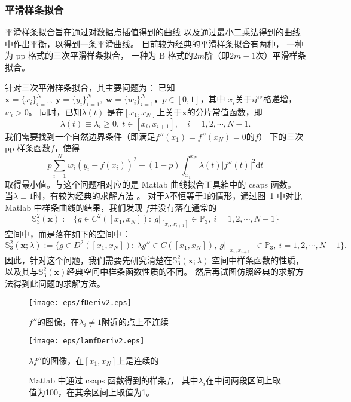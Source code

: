 \subsubsection{平滑样条拟合}
平滑样条拟合旨在通过对数据点插值得到的曲线
以及通过最小二乘法得到的曲线中作出平衡，以得到一条平滑曲线。
目前较为经典的平滑样条拟合有两种，
一种为 pp 格式的三次平滑样条拟合，
一种为 B 格式的$2m$阶（即$2m-1$次）平滑样条拟合。
  
针对三次平滑样条拟合，其主要问题为：
已知$\mathbf{x}=\{x_{i}\}_{i=1}^{N},\ \mathbf{y}=\{y_{i}\}_{i=1}^{N},
\ \mathbf{w}=\{w_{i}\}_{i=1}^{N}$，$p\in [0,1]$，其中
$x_{i}$关于$i$严格递增，$w_{i}>0$。
同时，已知$\lambda(t)$
是在$[x_{1},x_{N}]$上关于$\mathbf{x}$的分片常值函数，即
\begin{equation}
  \label{eq:lambdatx}
  \lambda(t)\equiv \lambda_{i}\ge 0,\
  t\in [x_{i},x_{i+1}],\quad i=1,2,\cdots,N-1.
\end{equation}
我们需要找到一个自然边界条件（即满足$f''(x_{1})=f''(x_{N})=0$的$f$）
下的三次 pp 样条函数$f$，使得
\begin{equation}
  \label{eq:cubicSmoothingSplinesFitting}
  p\sum_{i=1}^{N}w_{i}(y_{i}-f(x_{i}))^{2}+
  (1-p)\int_{x_{1}}^{x_{N}}\lambda(t)|f''(t)|^{2}\mathrm{d}t
\end{equation}
取得最小值。与这个问题相对应的是 Matlab 曲线拟合工具箱中的 csaps 函数。
当$\lambda\equiv1$时，有较为经典的求解方法
\cite{GuideToSplines}。
对于$\lambda$不恒等于1的情形，通过图~\ref{fig:cubicSplinesSpaceCompare}
中对比 Matlab 中样条曲线的结果，我们发现
$f$并没有落在通常的
\begin{equation}
  \label{eq:cubicSplinesSpace}
  \mathbb{S}_{3}^{2}(\mathbf{x}):=\{g\in C^{2}([x_{1},x_{N}]):
  \ g|_{[x_{i},x_{i+1}]}\in \mathbb{P}_{3},\ i=1,2,\cdots,N-1\}
\end{equation}
空间中，而是落在如下的空间中：
\begin{equation}
  \label{eq:cubicSplinesSpaceLambda}
  \mathbb{S}_{3}^{2}(\mathbf{x};\lambda)
  :=\{g\in D^{2}([x_{1},x_{N}]):
  \ \lambda g''\in C([x_{1},x_{N}]),
  \ g|_{[x_{i},x_{i+1}]}\in\mathbb{P}_{3},
  \ i=1,2,\cdots,N-1\}.
\end{equation}
因此，针对这个问题，我们需要先研究清楚在$\mathbb{S}_{3}^{2}(\mathbf{x};\lambda)$
空间中样条函数的性质，
以及其与$\mathbb{S}_{3}^{2}(\mathbf{x})$经典空间中样条函数性质的不同。
然后再试图仿照经典的求解方法得到此问题的求解方法。

\begin{figure}[h]  
  \centering   
  \begin{minipage}{0.42\textwidth}  
    \centering  
    \texttt{[image: eps/fDeriv2.eps]}  
    \caption*{$f''$的图像，在$\lambda_{i}\neq 1$附近的点上不连续}  
  \end{minipage}  
  \hfill  
  \begin{minipage}{0.42\textwidth}  
    \centering  
    \texttt{[image: eps/lamfDeriv2.eps]}  
    \caption*{$\lambda f''$的图像，在$[x_{1},x_{N}]$上是连续的}  
  \end{minipage}    
  \caption{ Matlab 中通过 csaps 函数得到的样条$f$，
    其中$\lambda_{i}$在中间两段区间上取值为100，在其余区间上取值为1。}
  \label{fig:cubicSplinesSpaceCompare}  
\end{figure}

